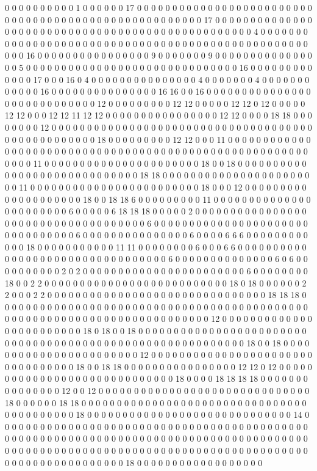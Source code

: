 0 0 0 0 0 0 0 0 0 0 1 0 0 0 0 0 0 17 0 0 0 0 0 0 0 0 0 0 0 0 0 0 0 0 0 0 0 0 0 0 0 0 0 0 0 0 0 0 0 0 0 0 0 0 0 0 0 0 0 0 0 0 0 0 0 0 0 0 0 0 0 17 0 0 0 0 0 0 0 0 0 0 0 0 0 0 0 0 0 0 0 0 0 0 0 0 0 0 0 0 0 0 0 0 0 0 0 0 0 0 0 0 0 0 0 0 0 0 0 0 0 4 0 0 0 0 0 0 0 0 0 0 0 0 0 0 0 0 0 0 0 0 0 0 0 0 0 0 0 0 0 0 0 0 0 0 0 0 0 0 0 0 0 0 0 0 0 0 0 0 0 0 0 0 0 16 0 0 0 0 0 0 0 0 0 0 0 0 0 0 0 0 9 0 0 0 0 0 0 0 9 0 0 0 0 0 0 0 0 0 0 0 0 0 0 0 0 5 0 0 0 0 0 0 0 0 0 0 0 0 0 0 0 0 0 0 0 0 0 0 0 0 0 0 0 0 0 0 16 0 0 0 0 0 0 0 0 0 0 0 0 0 17 0 0 0 16 0 4 0 0 0 0 0 0 0 0 0 0 0 0 0 0 0 4 0 0 0 0 0 0 0 4 0 0 0 0 0 0 0 0 0 0 0 0 16 0 0 0 0 0 0 0 0 0 0 0 0 0 0 0 16 16 0 0 16 0 0 0 0 0 0 0 0 0 0 0 0 0 0 0 0 0 0 0 0 0 0 0 0 0 0 0 0 12 0 0 0 0 0 0 0 0 0 12 12 0 0 0 0 0 12 12 0 12 0 0 0 0 0 12 12 0 0 0 12 12 11 12 12 0 0 0 0 0 0 0 0 0 0 0 0 0 0 0 0 12 12 0 0 0 0 18 18 0 0 0 0 0 0 0 0 12 0 0 0 0 0 0 0 0 0 0 0 0 0 0 0 0 0 0 0 0 0 0 0 0 0 0 0 0 0 0 0 0 0 0 0 0 0 0 0 0 0 0 0 0 0 0 0 0 0 0 18 0 0 0 0 0 0 0 0 0 12 12 0 0 0 11 0 0 0 0 0 0 0 0 0 0 0 0 0 0 0 0 0 0 0 0 0 0 0 0 0 0 0 0 0 0 0 0 0 0 0 0 0 0 0 0 0 0 0 0 0 0 0 0 0 0 0 0 0 0 0 0 0 0 0 11 0 0 0 0 0 0 0 0 0 0 0 0 0 0 0 0 0 0 0 0 0 0 18 0 0 18 0 0 0 0 0 0 0 0 0 0 0 0 0 0 0 0 0 0 0 0 0 0 0 0 0 0 0 0 0 18 18 0 0 0 0 0 0 0 0 0 0 0 0 0 0 0 0 0 0 0 0 0 0 0 11 0 0 0 0 0 0 0 0 0 0 0 0 0 0 0 0 0 0 0 0 0 0 0 0 18 0 0 0 12 0 0 0 0 0 0 0 0 0 0 0 0 0 0 0 0 0 0 0 0 18 0 0 18 18 6 0 0 0 0 0 0 0 0 0 11 0 0 0 0 0 0 0 0 0 0 0 0 0 0 0 0 0 0 0 0 0 0 0 6 0 0 0 0 0 6 18 18 18 0 0 0 0 0 2 0 0 0 0 0 0 0 0 0 0 0 0 0 0 0 0 0 0 0 0 0 0 0 0 0 0 0 0 0 0 0 0 0 0 0 0 6 0 0 0 0 0 0 0 0 0 0 0 0 0 0 0 0 0 0 0 0 0 0 0 0 0 0 0 0 0 0 0 0 6 0 0 0 0 0 0 0 0 0 0 0 0 0 0 0 6 0 0 0 0 6 6 6 0 0 0 0 0 0 0 0 0 0 0 0 18 0 0 0 0 0 0 0 0 0 0 0 11 11 0 0 0 0 0 0 0 0 6 0 0 0 6 6 0 0 0 0 0 0 0 0 0 0 0 0 0 0 0 0 0 0 0 0 0 0 0 0 0 0 0 0 0 0 0 0 0 6 0 0 0 0 0 0 0 0 0 0 0 0 0 0 6 0 6 0 0 0 0 0 0 0 0 0 0 2 0 2 0 0 0 0 0 0 0 0 0 0 0 0 0 0 0 0 0 0 0 0 0 0 0 6 0 0 0 0 0 0 0 0 18 0 0 2 2 0 0 0 0 0 0 0 0 0 0 0 0 0 0 0 0 0 0 0 0 0 0 0 0 0 0 18 0 18 0 0 0 0 0 0 2 2 0 0 0 2 2 0 0 0 0 0 0 0 0 0 0 0 0 0 0 0 0 0 0 0 0 0 0 0 0 0 0 0 0 0 0 0 18 18 18 0 0 0 0 0 0 0 0 0 0 0 0 0 0 0 0 0 0 0 0 0 0 0 0 0 0 0 0 0 0 0 0 0 0 0 0 0 0 0 0 0 0 0 0 0 0 0 0 0 0 0 0 0 0 0 0 0 0 0 0 0 0 0 0 0 0 0 0 0 0 0 0 0 12 0 0 0 0 0 0 0 0 0 0 0 0 0 0 0 0 0 0 0 0 0 0 0 0 18 0 18 0 0 18 0 0 0 0 0 0 0 0 0 0 0 0 0 0 0 0 0 0 0 0 0 0 0 0 0 0 0 0 0 0 0 0 0 0 0 0 0 0 0 0 0 0 0 0 0 0 0 0 0 0 0 0 0 0 0 0 0 0 18 0 0 18 0 0 0 0 0 0 0 0 0 0 0 0 0 0 0 0 0 0 0 0 0 0 0 12 0 0 0 0 0 0 0 0 0 0 0 0 0 0 0 0 0 0 0 0 0 0 0 0 0 0 0 0 0 0 0 0 0 18 0 0 18 18 0 0 0 0 0 0 0 0 0 0 0 0 0 0 0 0 12 12 0 12 0 0 0 0 0 0 0 0 0 0 0 0 0 0 0 0 0 0 0 0 0 0 0 0 0 0 0 0 0 18 0 0 0 0 18 18 18 18 0 0 0 0 0 0 0 0 0 0 0 0 0 0 0 12 0 0 12 0 0 0 0 0 0 0 0 0 0 0 0 0 0 0 0 0 0 0 0 0 0 0 0 0 0 0 0 0 0 18 0 0 0 0 0 0 18 18 0 0 0 0 0 0 0 0 0 0 0 0 0 0 0 0 0 0 0 0 0 0 0 0 0 0 0 0 0 0 0 0 0 0 0 0 0 0 0 0 0 0 18 0 0 0 0 0 0 0 0 0 0 0 0 0 0 0 0 0 0 0 0 0 0 0 0 0 0 0 0 0 14 0 0 0 0 0 0 0 0 0 0 0 0 0 0 0 0 0 0 0 0 0 0 0 0 0 0 0 0 0 0 0 0 0 0 0 0 0 0 0 0 0 0 0 0 0 0 0 0 0 0 0 0 0 0 0 0 0 0 0 0 0 0 0 0 0 0 0 0 0 0 0 0 0 0 0 0 0 0 0 0 0 0 0 0 0 0 0 0 0 0 0 0 0 0 0 0 0 0 0 0 0 0 0 0 0 0 0 0 0 0 0 0 0 0 0 0 0 0 0 0 0 0 0 0 0 0 0 0 0 0 0 0 0 0 0 0 0 0 0 0 0 0 0 0 0 0 0 18 0 0 0 0 0 0 0 0 0 0 0 0 0 0 0 0 0 0 